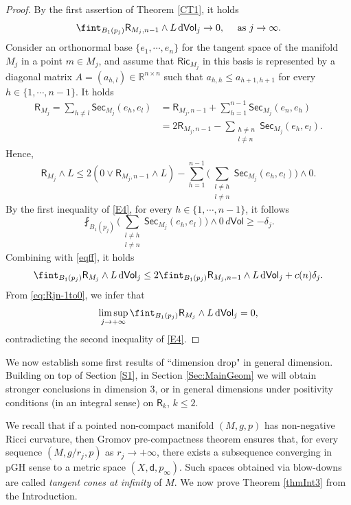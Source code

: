 \documentclass[10pt]{article}
\theoremstyle{definition}
\newcommand{\bb}[1]{\mathbb{#1}}
\newcommand{\ssf}[1]{\mathsf{#1}}
\newcommand{\Ric}{\mathsf{Ric}}
\newcommand{\sd}{\mathsf{d}}
\newcommand{\R}{\mathsf{R}}
\newcommand{\de}{{\rm d}}
\begin{document}
\begin{proof}
By the first assertion of Theorem \ref{CT1}, it holds
\begin{equation}\label{eq:Rjn-1to0}
\fint_{B_1(p_j)} \R_{M_j,n-1} \wedge L \,\de\ssf{Vol}_j \to 0, \quad \text{ as } j\to \infty.
\end{equation}
Consider an orthonormal base $\{e_1,\cdots,e_n\}$ for the tangent space of the manifold $M_j$ in a point $m \in M_j$, and assume that $\Ric_{M_j}$ in this basis is represented by a diagonal matrix $A=(a_{h,l}) \in \bb{R}^{n \times n}$ such that $a_{h,h} \leq a_{h+1,h+1}$ for every $h \in \{1, \cdots ,n-1\}$. It holds
\begin{align*}
\R_{M_j} = \sum_{h \neq l} \ssf{Sec}_{M_j}(e_h,e_l)&=\R_{M_j,n-1}+\sum_{h=1}^{n-1} \ssf{Sec}_{M_j}(e_n,e_h) \\
&=2\R_{M_j,n-1}-\sum_{\substack{ h \neq n \\ l \neq n}}\ssf{Sec}_{M_j}(e_h,e_l).
\end{align*}
Hence,
\begin{equation} \label{eqff}
\R_{M_j} \wedge L \leq 2(0 \vee \R_{M_j,n-1} \wedge L)-\sum_{h=1}^{n-1}\Big(\sum_{\substack{ l \neq h \\ l \neq n}}\ssf{Sec}_{M_j} (e_h,e_l)\Big) \wedge 0. 
\end{equation}
By the first inequality of \eqref{E4}, for every $h \in \{1,\cdots,n-1\}$, it follows
\[
\fint_{B_1(p_j)}\Big(\sum_{\substack{ l \neq h \\ l \neq n}}\ssf{Sec}_{M_j} (e_h,e_l)\Big) \wedge 0 \, d\ssf{Vol} \geq -\delta_j.
\]
Combining with \eqref{eqff}, it holds
\[
\fint_{B_1(p_j)} \R_{M_j} \wedge L \,\de\ssf{Vol}_j \leq 2\fint_{B_1(p_j)} \R_{M_j,n-1} \wedge L \,\de\ssf{Vol}_j + c(n)\delta_j.
\]
From \eqref{eq:Rjn-1to0}, we infer that
\[
\limsup_{j \to +\infty} \fint_{B_1(p_j)} \R_{M_j} \wedge L \,\de\ssf{Vol}_j= 0,
\]
contradicting the second inequality of \eqref{E4}.
\end{proof}

We now establish some first results of  ``dimension drop" in general dimension. Building on top of Section \ref{S1}, in Section \ref{Sec:MainGeom}   we will obtain stronger conclusions in dimension $3$, or in general dimensions under positivity conditions (in an integral sense) on  $\R_k$, $k\leq 2$. 

We recall that if a pointed non-compact manifold $(M,g,p)$ has non-negative Ricci curvature, then Gromov pre-compactness theorem ensures that, for every sequence $(M,g/r_j,p)$ as $r_j \to + \infty$, there exists a subsequence converging in pGH sense to a metric space $(X,\sd,p_\infty)$. 
Such  spaces obtained via blow-downs are called  \emph{tangent cones at infinity} of $M$.
We now prove Theorem \ref{thmInt3} from the Introduction.
\end{document}
